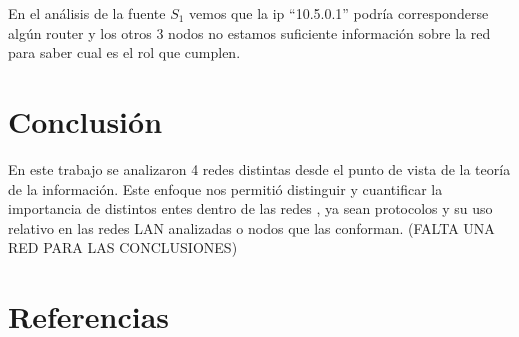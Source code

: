 \documentclass[final,inline,narroweqnarray,a4paper]{ieee}
\begin{document}
En el análisis de la fuente $S_1$ vemos que la ip ``10.5.0.1'' podría corresponderse algún router y los otros 3 nodos no estamos suficiente información sobre la red para saber cual es el rol que cumplen.

\section{Conclusión}
En este trabajo se analizaron 4 redes distintas desde el punto de vista de la teoría de la información. Este enfoque nos permitió distinguir y cuantificar la importancia de distintos entes dentro de las redes , ya sean protocolos y su uso relativo en las redes LAN analizadas o nodos que las conforman. (FALTA UNA RED PARA LAS CONCLUSIONES)


\section{Referencias}
\end{document}
